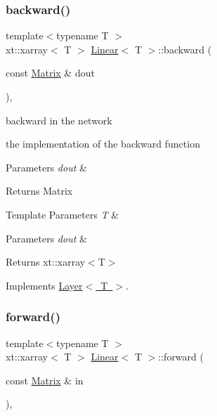\subsubsection{\texorpdfstring{backward()}{backward()}}
{\footnotesize\ttfamily template$<$typename T $>$ \\
xt\+::xarray$<$ T $>$ \mbox{\hyperlink{class_linear}{Linear}}$<$ T $>$\+::backward (\begin{DoxyParamCaption}\item[{const \mbox{\hyperlink{class_layer_a22b1e7286096aa62bd245536c8ebdaf1}{Matrix}} \&}]{dout }\end{DoxyParamCaption})\hspace{0.3cm}{\ttfamily [override]}, {\ttfamily [virtual]}}



backward in the network 

the implementation of the backward function


\begin{DoxyParams}{Parameters}
{\em dout} & \\
\hline
\end{DoxyParams}
\begin{DoxyReturn}{Returns}
Matrix
\end{DoxyReturn}

\begin{DoxyTemplParams}{Template Parameters}
{\em T} & \\
\hline
\end{DoxyTemplParams}

\begin{DoxyParams}{Parameters}
{\em dout} & \\
\hline
\end{DoxyParams}
\begin{DoxyReturn}{Returns}
xt\+::xarray$<$\+T$>$ 
\end{DoxyReturn}


Implements \mbox{\hyperlink{class_layer_ac4c13a3a85bfdd4d7d4d18669e3299fe}{Layer$<$ T $>$}}.

\mbox{\label{class_linear_a901668e9219a8d446b2ac60718b9c9f1}} 
\subsubsection{\texorpdfstring{forward()}{forward()}}
{\footnotesize\ttfamily template$<$typename T $>$ \\
xt\+::xarray$<$ T $>$ \mbox{\hyperlink{class_linear}{Linear}}$<$ T $>$\+::forward (\begin{DoxyParamCaption}\item[{const \mbox{\hyperlink{class_layer_a22b1e7286096aa62bd245536c8ebdaf1}{Matrix}} \&}]{in }\end{DoxyParamCaption})\hspace{0.3cm}{\ttfamily [override]}, {\ttfamily [virtual]}}



